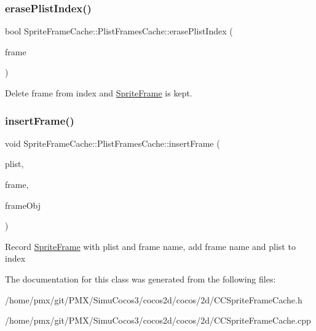 \subsubsection{\texorpdfstring{erase\+Plist\+Index()}{erasePlistIndex()}}
{\footnotesize\ttfamily bool Sprite\+Frame\+Cache\+::\+Plist\+Frames\+Cache\+::erase\+Plist\+Index (\begin{DoxyParamCaption}\item[{const std\+::string \&}]{frame }\end{DoxyParamCaption})}

Delete frame from index and \hyperlink{classSpriteFrame}{Sprite\+Frame} is kept. \mbox{\label{classSpriteFrameCache_1_1PlistFramesCache_a3b71e2f7372224a7467ac0505d895b57}} 
\subsubsection{\texorpdfstring{insert\+Frame()}{insertFrame()}}
{\footnotesize\ttfamily void Sprite\+Frame\+Cache\+::\+Plist\+Frames\+Cache\+::insert\+Frame (\begin{DoxyParamCaption}\item[{const std\+::string \&}]{plist,  }\item[{const std\+::string \&}]{frame,  }\item[{\hyperlink{classSpriteFrame}{Sprite\+Frame} $\ast$}]{frame\+Obj }\end{DoxyParamCaption})}

Record \hyperlink{classSpriteFrame}{Sprite\+Frame} with plist and frame name, add frame name and plist to index 

The documentation for this class was generated from the following files\+:\begin{DoxyCompactItemize}
\item 
/home/pmx/git/\+P\+M\+X/\+Simu\+Cocos3/cocos2d/cocos/2d/C\+C\+Sprite\+Frame\+Cache.\+h\item 
/home/pmx/git/\+P\+M\+X/\+Simu\+Cocos3/cocos2d/cocos/2d/C\+C\+Sprite\+Frame\+Cache.\+cpp\end{DoxyCompactItemize}
